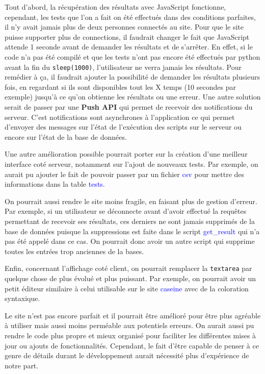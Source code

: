 \documentclass[a4paper]{article}
\renewcommand{\texttt}[2][blue]{\textcolor{#1}{\ttfamily #2}}
\begin{document}
  Tout d'abord, la récupération des résultats avec JavaScript fonctionne,
  cependant, les tests que l'on a fait on été effectués dans des conditions
  parfaites, il n'y avait jamais plus de deux personnes connectés au site. Pour
  que le site puisse supporter plus de connections, il faudrait changer le fait
  que JavaScript attende 1 seconde avant de demander les résultats et de
  s'arrêter. En effet, si le code n'a pas été compilé et que les tests n'ont
  pas encore été effectués par python avant la fin du \lstinline{sleep(1000)},
  l'utilisateur ne verra jamais les résultats. Pour remédier à ça, il faudrait
  ajouter la possibilité de demander les résultats plusieurs fois, en regardant
  si ils sont disponibles tout les X temps (10 secondes par exemple) jusqu'à ce
  qu'on obtienne les résultats ou une erreur. Une autre solution serait de
  passer par une \textbf{Push API} qui permet de recevoir des notifications du
  serveur. C'est notifications sont asynchrones à l'application ce qui permet
  d'envoyer des messages sur l'état de l'exécution des scripts sur le serveur
  ou encore sur l'état de la base de données.

  Une autre amélioration possible pourrait porter sur la création d'une
  meilleur interface coté serveur, notamment sur l'ajout de nouveaux tests. Par
  exemple, on aurait pu ajouter le fait de pouvoir passer par un fichier
  \texttt{csv} pour mettre des informations dans la table \texttt{tests}.

  On pourrait aussi rendre le site moins fragile, en faisant plus de gestion
  d'erreur. Par exemple, si un utilisateur se déconnecte avant d'avoir effectué
  la requêtes permettant de recevoir ses résultats, ces derniers ne sont jamais
  supprimés de la base de données puisque la suppressions est faite dans le
  script \texttt{get\_result} qui n'a pas été appelé dans ce cas. On pourrait
  donc avoir un autre script qui supprime toutes les entrées trop anciennes de
  la bases.

  Enfin, concernant l'affichage coté client, on pourrait remplacer la
  \lstinline{textarea} par quelque chose de plus évolué et plus puissant. Par
  exemple, on pourrait avoir un petit éditeur similaire à celui utilisable sur
  le site \texttt{caseine} avec de la coloration syntaxique.

  Le site n'est pas encore parfait et il pourrait être amélioré pour être plus
  agréable à utiliser mais aussi moins perméable aux potentiels erreurs. On
  aurait aussi pu rendre le code plus propre et mieux organisé pour faciliter
  les différentes mises à jour ou ajouts de fonctionnalités. Cependant, le fait
  d'être capable de penser à ce genre de détails durant le développement aurait
  nécessité plus d'expérience de notre part.
\end{document}
